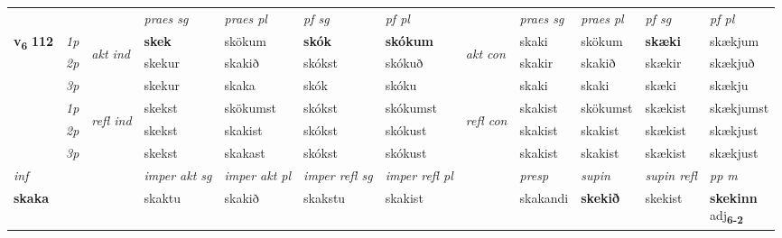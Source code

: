 \begin{longtable}[l]{X>{\footnotesize\itshape}llXXXXlXXXX}
 & &   & \textit{praes sg}  & \textit{praes pl}    & \textit{ pf sg} & \textit{pf pl} & & \textit{praes sg}  & \textit{praes pl}    & \textit{pf sg} & \textit{pf pl }  \\ \cmidrule{4-7} \cmidrule{9-12}
 \multirow{2}{*}{{{\textbf{v{\textsubscript{6}}} \Large{\textbf{112}}}}}  & 1p & \multirow{3}{*}{\begin{turn}{90}\textit{akt ind}\end{turn}} & \textbf{skek} & skökum & \textbf{skók} & \textbf{skókum} & \multirow{3}{*}{\begin{turn}{90}\textit{akt con}\end{turn}} &skaki & skökum & \textbf{skæki} & skækjum\\*
 & 2p &  &  skekur  & skakið & skókst & skókuð & & skakir & skakið & skækir & skækjuð \\*
 & 3p &  & skekur & skaka & skók & skóku & & skaki & skaki& skæki & skækju \\*
\cmidrule{4-7} \cmidrule{9-12}
 & 1p & \multirow{3}{*}{\begin{turn}{90}\textit{refl ind}\end{turn}}  & skekst & skökumst & skókst & skókumst & \multirow{3}{*}{\begin{turn}{90}\textit{refl con}\end{turn}}  &skakist & skökumst & skækist & skækjumst \\*
 & 2p &  & skekst & skakist & skókst & skókust & &skakist & skakist & skækist & skækjust \\*
 & 3p  & & skekst & skakast & skókst & skókust & & skakist & skakist& skækist & skækjust \\*
\cmidrule{4-7} \cmidrule{9-12}

   {\textit{inf}} & &  & \textit{imper akt sg} & \textit{imper akt pl} & \textit{imper refl sg} & \textit{imper refl pl} && \textit{presp} & \textit{supin} & \textit{supin refl} & \textit{pp m} \\*
  {\textbf{skaka}} & && skaktu  & skakið & skakstu & skakist && skakandi &  \textbf{skekið} & skekist & \specialcell{\textbf{skekinn} \\ adj\textbf{\textsubscript{6-2}}} \\*

\midrule


\end{longtable}
